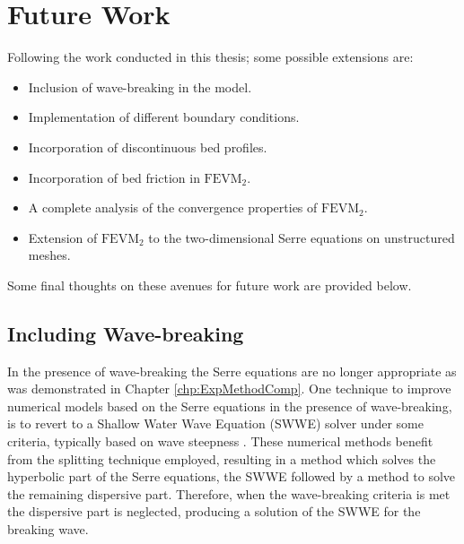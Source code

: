 \section{Future Work}
Following the work conducted in this thesis; some possible extensions are:
\begin{itemize}
	\item Inclusion of wave-breaking in the model.
	\item Implementation of different boundary conditions.
	\item Incorporation of discontinuous bed profiles.
	\item Incorporation of bed friction in $\text{FEVM}_2$.
	\item A complete analysis of the convergence properties of $\text{FEVM}_2$.
	\item Extension of $\text{FEVM}_2$ to the two-dimensional Serre equations on unstructured meshes.
\end{itemize}
Some final thoughts on these avenues for future work are provided below.

\subsection{Including Wave-breaking}
In the presence of wave-breaking the Serre equations are no longer appropriate as was demonstrated in Chapter \ref{chp:ExpMethodComp}. One technique to improve numerical models based on the Serre equations in the presence of wave-breaking, is to revert to a Shallow Water Wave Equation (SWWE) solver under some criteria, typically based on wave steepness \cite{Tissier-2011,Filippini-etal-2016-381,DoCarmo-2019-125}. These numerical methods benefit from the splitting technique employed, resulting in a method which solves the hyperbolic part of the Serre equations, the SWWE followed by a method to solve the remaining dispersive part. Therefore, when the wave-breaking criteria is met the dispersive part is neglected, producing a solution of the SWWE for the breaking wave. 

